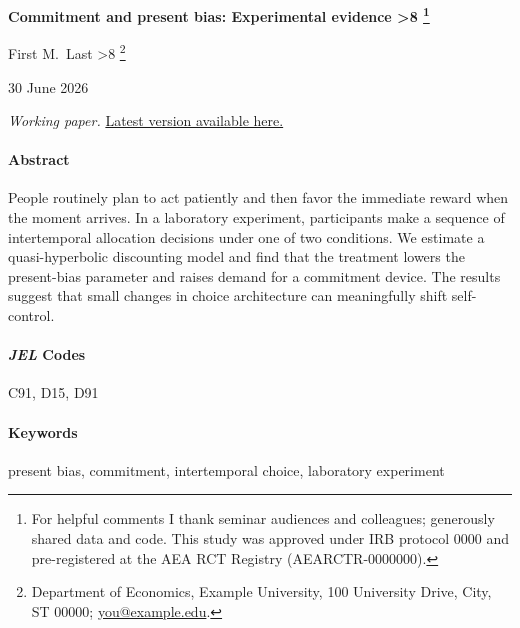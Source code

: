 \documentclass[
    fontsize=12pt,DIV=10,fleqn,
    letterpaper,oneside,paper=portrait,
]{scrartcl}
\newcounter{savefootnote}
\newcounter{symfootnote}
\newcommand{\symfootnote}[1]{%
  \setcounter{savefootnote}{\value{footnote}}%
  \setcounter{footnote}{\value{symfootnote}}%
  \ifnum\value{footnote}>8\setcounter{footnote}{0}\fi%
  \let\oldthefootnote=\thefootnote%
  \renewcommand{\thefootnote}{\fnsymbol{footnote}}%
  \footnote{#1}%
  \let\thefootnote=\oldthefootnote%
  \setcounter{symfootnote}{\value{footnote}}%
  \setcounter{footnote}{\value{savefootnote}}%
}
\newcommand{\papertitle}{Commitment and present bias: Experimental evidence}
\newcommand{\paperauthor}{First M.~Last}
\newcommand{\paperdate}{30 June 2026}
\begin{document}

\thispagestyle{empty}

\vspace*{6pt}

\begin{center}%

\textbf{\sffamily\LARGE \papertitle\symfootnote{For helpful comments I thank
seminar audiences and colleagues; \textcite{RoeSmith2019} generously shared
data and code. This study was approved under IRB protocol 0000 and
pre-registered at the AEA RCT Registry (AEARCTR-0000000).}}

\vfill

{\large

\paperauthor\symfootnote{Department of Economics, Example University, 100
University Drive, City, ST 00000; \href{mailto:you@example.edu}{you@example.edu}.}

\vspace{\baselineskip}

\paperdate

\vspace{\baselineskip}

}

\textit{Working paper.} \href{https://example.com/paper.pdf}{Latest version available here.}

\end{center}%

\vfill
\vspace{-1\baselineskip}

\paragraph{Abstract}
People routinely plan to act patiently and then favor the immediate reward when
the moment arrives. In a laboratory experiment, participants make a sequence of
intertemporal allocation decisions under one of two conditions. We estimate a
quasi-hyperbolic discounting model and find that the treatment lowers the
present-bias parameter and raises demand for a commitment device. The results
suggest that small changes in choice architecture can meaningfully shift
self-control.

\vfill
\vspace{-1\baselineskip}

{\RaggedRight

\paragraph{\emph{JEL} Codes} C91, D15, D91

\paragraph{Keywords} present bias, commitment, intertemporal choice, laboratory experiment

}
\end{document}
